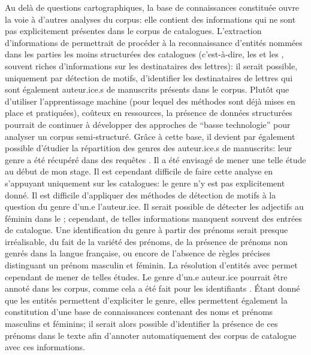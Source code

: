 Au delà de questions cartographiques, la base de connaissances constituée ouvre la voie à d'autres analyses du corpus: elle contient des informations qui ne sont pas explicitement présentes dans le corpus de catalogues. L'extraction d'informations de \wkd{} permettrait de procéder à la reconnaissance d'entités nommées dans les parties les moins structurées des catalogues (c'est-à-dire, les \tnote{} et les \tdesc{}, souvent riches d'informations sur les destinataires des lettres): il serait possible, uniquement par détection de motifs, d'identifier les destinataires de lettres qui sont également auteur.ice.s de manuscrits présents dans le corpus. Plutôt que d'utiliser l'apprentissage machine (pour lequel des méthodes sont déjà mises en place et pratiquées), coûteux en ressources, la présence de données structurées pourrait de continuer à développer des approches de \enquote{basse technologie} pour analyser un corpus semi-structuré. Grâce à cette base, il devient par également possible d'étudier la répartition des genres des auteur.ice.s de manuscrits: leur genre a été récupéré dans des requêtes \sparql{}. Il a été envisagé de mener une telle étude au début de mon stage. Il est cependant difficile de faire cette analyse en s'appuyant uniquement sur les catalogues: le genre n'y est pas explicitement donné. Il est difficile d'appliquer des méthodes de détection de motifs à la question du genre d'un.e l'auteur.ice. Il serait possible de détecter les adjectifs au féminin dans le \ttrait{}; cependant, de telles informations manquent souvent des entrées de catalogue. Une identification du genre à partir des prénoms serait presque irréalisable, du fait de la variété des prénoms, de la présence de prénoms non genrés dans la langue française, ou encore de l'absence de règles précises distinguant un prénom masculin et féminin. La résolution d'entités avec \wkd{} permet cependant de mener de telles études. Le genre d'un.e auteur.ice pourrait être annoté dans les corpus, comme cela a été fait pour les identifiants \wkd{}. Étant donné que les entités permettent d'expliciter le genre, elles permettent également la constitution d'une base de connaissances contenant des noms et prénoms masculins et féminins; il serait alors possible d'identifier la présence de ces prénoms dans le texte afin d'annoter automatiquement des corpus de catalogue avec ces informations.


